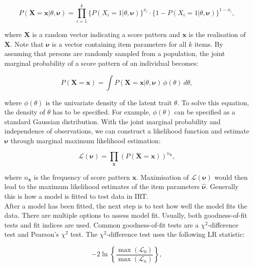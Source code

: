 \documentclass[Royal,sageapa,times,doublespace]{sagej}
\begin{document}
\begin{equation}
P(\boldsymbol{X} = \boldsymbol{x} | \theta, \boldsymbol{\nu}) = \prod_{i=1}^{k} \{P(X_i = 1 | \theta, \boldsymbol{\nu})\}^{x_i} \cdot  \{1 - P(X_i = 1 | \theta, \boldsymbol{\nu}) \}^{1 - x_i},
\end{equation}

where $\boldsymbol{X}$ is a random vector indicating a score pattern and $\boldsymbol{x}$ is the realisation of $\boldsymbol{X}$. Note that $\boldsymbol{\nu}$ is a vector containing item parameters for all $k$ items. By assuming that persons are randomly sampled from a population, the joint marginal probability of a score pattern of an individual becomes:

\begin{equation}
P(\boldsymbol{X} = \boldsymbol{x}) = \int P(\boldsymbol{X} = \boldsymbol{x} | \theta, \boldsymbol{\nu}) \,\phi(\theta)\,d\theta,
\end{equation}

where $\phi(\theta)$ is the univariate density of the latent trait $\theta$. To solve this equation, the density of $\theta$ has to be specified. For example, $\phi(\theta)$ can be specified as a standard Gaussian distribution. With the joint marginal probability and independence of observations, we can construct a likelihood function and estimate $\boldsymbol{\nu}$ through marginal maximum likelihood estimation:

\begin{equation}
\mathcal{L}(\boldsymbol{\nu}) = \prod_{\boldsymbol{x}} (P(\boldsymbol{X} = \boldsymbol{x}))^{n_{\boldsymbol{x}}},
\end{equation}

where $n_{\boldsymbol{x}}$ is the frequency of score pattern $\boldsymbol{x}$. Maximisation of $\mathcal{L}(\boldsymbol{\nu})$ would then lead to the maximum likelihood estimates of the item parameters $\boldsymbol{\hat{\nu}}$. Generally this is how a model is fitted to test data in IRT. \\
\indent After a model has been fitted, the next step is to test how well the model fits the data. There are multiple options to assess model fit. Usually, both goodness-of-fit tests and fit indices are used. Common goodness-of-fit tests are a $\chi^2$-difference test and Pearson's $\chi^2$ test. The $\chi^2$-difference test uses the following LR statistic:

\begin{equation}
- 2 \ln \left \{ \frac{\max(\mathcal{L}_0)}{\max(\mathcal{L}_a)} \right \},
\end{equation}
\end{document}
